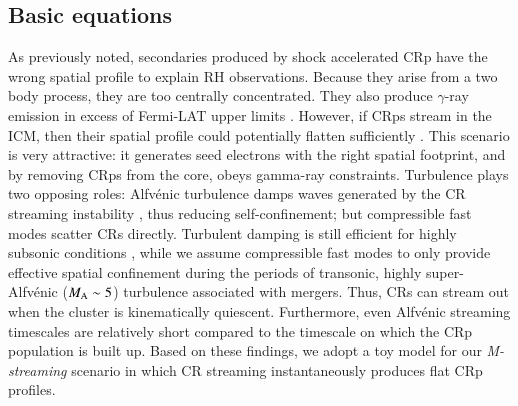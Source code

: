 \documentclass[fleqn,usenatbib,useAMS]{mnras}
\newcommand{\Mstream}{{\it M-streaming}\xspace}
\begin{document}
\subsection{Basic equations}
As previously noted, secondaries produced by shock accelerated CRp
have the wrong spatial profile to explain RH observations. Because
they arise from a two body process, they are too centrally
concentrated. They also produce $\gamma$-ray emission in excess of
Fermi-LAT upper limits
\citep{2012ApJ...757..123A,brunetti12,2014ApJ...787...18A}. However,
if CRps stream in the ICM, then their spatial profile could
potentially flatten sufficiently \citep{ensslin11,wiener13}. This
scenario is very attractive: it generates seed electrons with the
right spatial footprint, and by removing CRps from the core, obeys
gamma-ray constraints. Turbulence plays two opposing roles:
Alfv{\'e}nic turbulence damps waves generated by the CR streaming
instability \citep{yan02,farmer04}, thus reducing self-confinement;
but compressible fast modes scatter CRs directly. Turbulent damping is
still efficient for highly subsonic conditions \citep{wiener13}, while
we assume compressible fast modes to only provide effective spatial
confinement during the periods of transonic, highly super-Alfv{\'e}nic
($M_{\rm A} \sim 5$) turbulence associated with mergers. Thus, CRs can
stream out when the cluster is kinematically quiescent. Furthermore,
even Alfv{\'e}nic streaming timescales are relatively short
\cite[$\sim 0.1-0.5$ Gyr;][]{wiener13} compared to the timescale on
which the CRp population is built up. Based on these findings, we
adopt a toy model for our \Mstream scenario in which CR streaming
instantaneously produces flat CRp profiles. 
\end{document}
